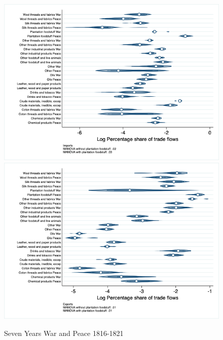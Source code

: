 \documentclass[12pt,a4paper,notitlepage,english]{article}
\begin{document}
\begin{figure}
\centering
\caption{Seven Years War and Peace 1816-1821}
\label{seven_peace1764_1777_nat_distr_sitc}
\includegraphics[scale=.4]{seven_peace1764_1777_nat_distr_Isitc}
\includegraphics[scale=.4]{seven_peace1764_1777_nat_distr_Xsitc}
\end{figure}
\end{document}

